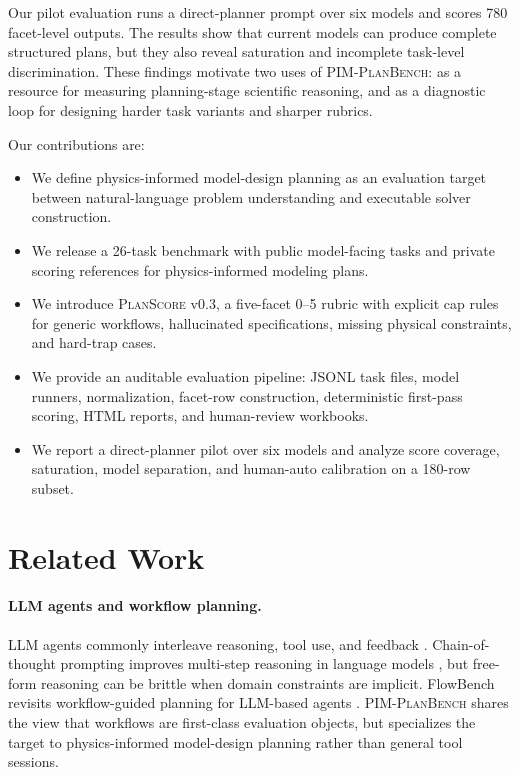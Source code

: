 \documentclass[11pt]{article}
\newcommand{\pimplanbench}{\textsc{PIM-PlanBench}}
\newcommand{\planscore}{\textsc{PlanScore}}
\begin{document}
Our pilot evaluation runs a direct-planner prompt over six models and scores 780 facet-level outputs. The results show that current models can produce complete structured plans, but they also reveal saturation and incomplete task-level discrimination. These findings motivate two uses of \pimplanbench{}: as a resource for measuring planning-stage scientific reasoning, and as a diagnostic loop for designing harder task variants and sharper rubrics.

Our contributions are:
\begin{itemize}
    \item We define physics-informed model-design planning as an evaluation target between natural-language problem understanding and executable solver construction.
    \item We release a 26-task benchmark with public model-facing tasks and private scoring references for physics-informed modeling plans.
    \item We introduce \planscore{} v0.3, a five-facet 0--5 rubric with explicit cap rules for generic workflows, hallucinated specifications, missing physical constraints, and hard-trap cases.
    \item We provide an auditable evaluation pipeline: JSONL task files, model runners, normalization, facet-row construction, deterministic first-pass scoring, HTML reports, and human-review workbooks.
    \item We report a direct-planner pilot over six models and analyze score coverage, saturation, model separation, and human-auto calibration on a 180-row subset.
\end{itemize}

\section{Related Work}

\paragraph{LLM agents and workflow planning.}
LLM agents commonly interleave reasoning, tool use, and feedback \citep{react2023}. Chain-of-thought prompting improves multi-step reasoning in language models \citep{wei2022cot}, but free-form reasoning can be brittle when domain constraints are implicit. FlowBench revisits workflow-guided planning for LLM-based agents \citep{flowbench2024}. \pimplanbench{} shares the view that workflows are first-class evaluation objects, but specializes the target to physics-informed model-design planning rather than general tool sessions.
\end{document}
